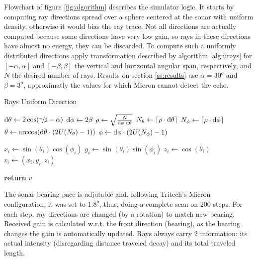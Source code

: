 Flowchart of figure \ref{fig:algorithm} describes the simulator logic. It starts
by computing ray directions spread over a sphere centered at the sonar with
uniform density, otherwise it would bias the ray trace. Not all directions are
actually computed because some directions have very low gain, so rays in these directions
have almost no energy, they can be discarded. To compute such a uniformly
distributed directions apply transformation described by algorithm
\ref{alg:urays} for $[-\alpha,\alpha]$ and $[-\beta,\beta]$ the vertical and
horizontal angular span, respectively, and $N$ the desired number of rays.
Results on section \ref{ss:results} use $\alpha = 30^o$ and $\beta = 3^o$,
approximatly the values for which Micron cannot detect the echo. 


\begin{algorithm}
\caption{Rays Uniform Direction}
\label{alg:urays}
\begin{algorithmic}

\State $\mathrm{d}\theta \gets 2\cos(\nicefrac{\pi}{2}-\alpha)$
\State $\mathrm{d}\phi \gets 2\beta $
\State $\rho \gets \sqrt{\frac{N}{\mathrm{d}\phi\cdot\mathrm{d}\theta}}$ 
\State $N_\theta \gets \lceil\rho\cdot\mathrm{d}\theta\rceil$
\State $N_\phi \gets \lceil\rho\cdot\mathrm{d}\phi\rceil$
\State $\theta \gets \arccos(\mathrm{d}\theta\cdot (2U(N_\theta)-1))$ 
\State $\phi \gets \mathrm{d}\phi\cdot (2U(N_\phi)-1)$

\State $x_i \gets \sin(\theta_i)\cos(\phi_i)$
\State $y_i \gets \sin(\theta_i)\sin(\phi_i)$
\State $z_i \gets \cos(\theta_i)$
\State $v_i \gets (x_i,y_i,z_i)$
\EndFor

\State \textbf{return} $v$
\EndProcedure
\end{algorithmic}
\end{algorithm}

The sonar bearing pace is adjutable and, following Tritech's Micron
configuration, it was set to $1.8^o$, thus, doing a complete scan on $200$ steps. For each step, ray
directions are changed (by a rotation) to match new bearing. Received gain is
calculated w.r.t. the front direction (bearing), as the bearing changes the gain
is automatically updated. Rays always carry 2 information: its actual
intensity (disregarding distance traveled decay) and its total traveled length.

